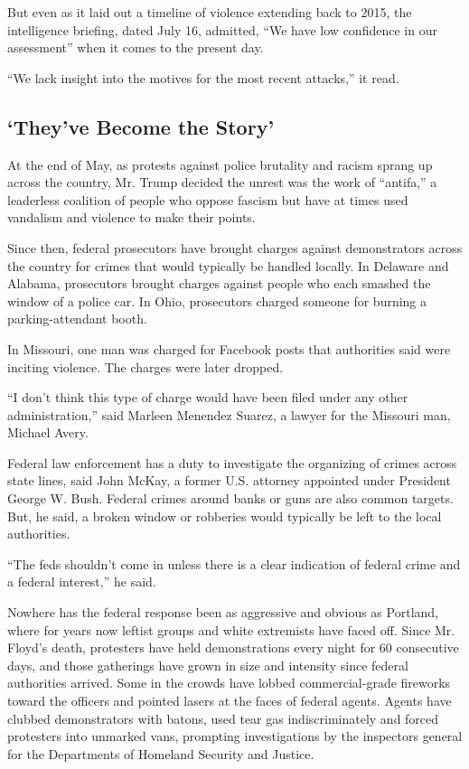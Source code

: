 But even as it laid out a timeline of violence extending back to 2015,
the intelligence briefing, dated July 16, admitted, ``We have low
confidence in our assessment'' when it comes to the present day.

``We lack insight into the motives for the most recent attacks,'' it
read.

\hypertarget{theyve-become-the-story}{%
\subsection{`They've Become the Story'}\label{theyve-become-the-story}}

At the end of May, as protests against police brutality and racism
sprang up across the country, Mr. Trump decided the unrest was the work
of ``antifa,'' a leaderless coalition of people who oppose fascism but
have at times used vandalism and violence to make their points.

Since then, federal prosecutors have brought charges against
demonstrators across the country for crimes that would typically be
handled locally. In Delaware and Alabama, prosecutors brought charges
against people who each smashed the window of a police car. In Ohio,
prosecutors charged someone for burning a parking-attendant booth.

In Missouri, one man was charged for Facebook posts that authorities
said were inciting violence. The charges were later dropped.

``I don't think this type of charge would have been filed under any
other administration,'' said Marleen Menendez Suarez, a lawyer for the
Missouri man, Michael Avery.

Federal law enforcement has a duty to investigate the organizing of
crimes across state lines, said John McKay, a former U.S. attorney
appointed under President George W. Bush. Federal crimes around banks or
guns are also common targets. But, he said, a broken window or robberies
would typically be left to the local authorities.

``The feds shouldn't come in unless there is a clear indication of
federal crime and a federal interest,'' he said.

Nowhere has the federal response been as aggressive and obvious as
Portland, where for years now leftist groups and white extremists have
faced off. Since Mr. Floyd's death, protesters have held demonstrations
every night for 60 consecutive days, and those gatherings have grown in
size and intensity since federal authorities arrived. Some in the crowds
have lobbed commercial-grade fireworks toward the officers and pointed
lasers at the faces of federal agents. Agents have clubbed demonstrators
with batons, used tear gas indiscriminately and forced protesters into
unmarked vans, prompting investigations by the inspectors general for
the Departments of Homeland Security and Justice.

